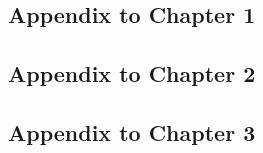\documentclass[letterpaper,12pt, oneside]{memoir} %
\begin{document}
\mainmatter



\begin{appendices}
  \chapter{Appendix to Chapter 1}
  
\end{appendices}

\begin{appendices}
  \chapter{Appendix to Chapter 2}
  
\end{appendices}

\begin{appendices}
  \chapter{Appendix to Chapter 3}
  
\end{appendices}




\backmatter

\SingleSpacing %



\end{document}
